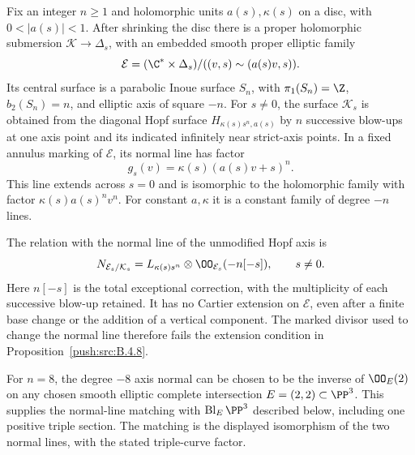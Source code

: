 \begin{proposition}\hypertarget{tag-030E}{}\label{push:src:B.4.10}

Fix an integer $n\ge1$ and holomorphic units $a(s),\kappa(s)$ on a
disc, with $0<|a(s)|<1$. After shrinking the disc there is a proper
holomorphic submersion $\mathcal K\to\Delta_s$, with an embedded smooth
proper elliptic family
\[
 \mathcal E=(\C^*\times\Delta_s)/
       ((v,s)\sim(a(s)v,s)).
\]
Its central surface is a parabolic Inoue surface $S_n$, with
$\pi_1(S_n)=\Z$, $b_2(S_n)=n$, and elliptic axis of square $-n$.
For $s\ne0$, the surface $\mathcal K_s$ is obtained from the diagonal
Hopf surface $H_{\kappa(s)s^n,a(s)}$ by $n$ successive blow-ups at one
axis point and its indicated infinitely near strict-axis points.
In a fixed annulus marking of $\mathcal E$, its normal line has factor
\[
 g_s(v)=\kappa(s)(a(s)v+s)^n.
\]
This line extends across $s=0$ and is isomorphic to the holomorphic
family with factor $\kappa(s)a(s)^n v^n$.
For constant $a,\kappa$ it is a constant family of degree $-n$ lines.

The relation with the normal line of the unmodified Hopf axis is
\[
 N_{\mathcal E_s/\mathcal K_s}
   =L_{\kappa(s)s^n}\otimes\OO_{\mathcal E_s}(-n[-s]),
       \qquad s\ne0.
\]
Here $n[-s]$ is the total exceptional correction, with the
multiplicity of each successive blow-up retained. It has no
Cartier extension on $\mathcal E$, even after a finite base change or
the addition of a vertical component. The marked divisor used to change the normal line therefore
fails the extension condition in Proposition~\ref{push:src:B.4.8}.

For $n=8$, the degree $-8$ axis normal can be chosen to be the inverse
of $\OO_E(2)$ on any chosen smooth elliptic complete intersection
$E=(2,2)\subset\PP^3$. This supplies the normal-line matching with
$\operatorname{Bl}_E\PP^3$ described below, including one positive
triple section. The matching is the displayed isomorphism of the two normal lines,
with the stated triple-curve factor.
\end{proposition}


